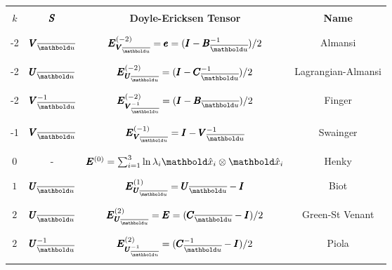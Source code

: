 \begin{table}[!htt]
\small
\centering
\begin{tabular}{|c|c|c|c|}
\hline
& & &\\
\textbf{   $k$   } & $\pmb{S}$  &\textbf{  Doyle-Ericksen Tensor    } & \textbf{   Name   } \\
& & & \\
\hline
& & & \\
-2 & $\tnr{V}_{\overline{\vto{u}}}$   & $\tnr{E}_{\tnr{V}_{\overline{\vto{u}}}}^{(-2)}=\tnr{e}=(\tnr{I} - \tnr{B}^{-1}_{\overline{\vto{u}}})/2$   & Almansi\\
& & & \\
\hline
& & & \\
-2 & $\tnr{U}_{\overline{\vto{u}}}$  & $\tnr{E}_{\tnr{U}_{\overline{\vto{u}}}}^{(-2)}=(\tnr{I} - \tnr{C}^{-1}_{\overline{\vto{u}}})/2$   & Lagrangian-Almansi\index{strain!Lagrangian-Almansi} \\
& & & \\
\hline
& & & \\
-2 & $\tnr{V}^{-1}_{\overline{\vto{u}}}$  & $\tnr{E}_{\tnr{V}^{-1}_{\overline{\vto{u}}}}^{(-2)}=(\tnr{I} - \tnr{B}_{\overline{\vto{u}}})/2$   & Finger\index{strain!Finger} \\
& & & \\
\hline
& & & \\
-1 & $\tnr{V}_{\overline{\vto{u}}}$  & $\tnr{E}_{\tnr{V}_{\overline{\vto{u}}}}^{(-1)}=\tnr{I} - \tnr{V}^{-1}_{\overline{\vto{u}}}$   & Swainger\index{strain!Swainger} \\
& & & \\
\hline
& & &\\
$0$ & - & $\tnr{E}^{(0)}=\sum_{i=1}^3\ln\lambda_i\vun{x}_{i}\otimes\vun{x}_{i}$   & Henky\index{strain!Henky} \\
& & &\\
\hline
& & &\\
$1$ &  $\tnr{U}_{\overline{\vto{u}}}$ &$\tnr{E}_{\tnr{U}_{\overline{\vto{u}}}}^{(1)}=\tnr{U}_{\overline{\vto{u}}}-\tnr{I}$ & Biot\index{Biot!tensor medida de} \\
& & &\\
\hline
& & & \\
$2$ & $\tnr{U}_{\overline{\vto{u}}}$ & $\tnr{E}_{\tnr{U}_{\overline{\vto{u}}}}^{(2)}=\tnr{E}=(\tnr{C}_{\overline{\vto{u}}}-\tnr{I})/2$ & Green-St Venant\\
& & & \\
\hline
& & &\\
$2$ & $\tnr{U}^{-1}_{\overline{\vto{u}}}$ & $\tnr{E}_{\tnr{U}^{-1}_{\overline{\vto{u}}}}^{(2)}=(\tnr{C}^{-1}_{\overline{\vto{u}}}-\tnr{I})/2$ & Piola\index{strain!Piola} \\
& & & \\
\hline
\end{tabular}
\vspace{9pt}
\label{tb:strains}
\end{table}

